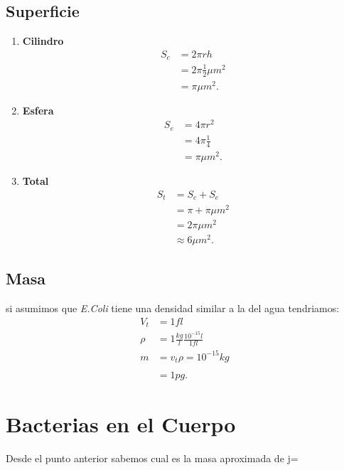 \documentclass{report}
\begin{document}
\subsection{Superficie}

\begin{enumerate}
  \item \textbf{Cilindro}
    \begin{align*}
      S_{c} &= 2\pi rh \\
      &= 2\pi \frac{1}{2} \mu m^2 \\
      &= \pi \mu m^2
    .\end{align*}
  \item \textbf{Esfera}
    \begin{align*}
      S_{e} &=  4 \pi r^2\\
      &= 4 \pi \frac{1}{4} \\
      &= \pi \mu m^2
    .\end{align*}
  \item \textbf{Total}
    \begin{align*}
      S_{t} &= S_{c} + S_{e} \\
      &= \pi + \pi \mu m^2 \\
      &= 2\pi \mu m^2 \\
      &\approx 6 \mu m^2
    .\end{align*}
\end{enumerate}

\subsection{Masa}
si asumimos que \textit{E.Coli} tiene una densidad similar a la del agua tendriamos:
\begin{align*}
  V_{t} &= 1 fl \\
  \rho &= 1 \frac{kg}{l} \frac{10^{-15}l}{1 fl} \\
  m &= v_{t}\rho = 10^{-15}kg \\ \\
  &= 1 pg
.\end{align*}

\section{Bacterias en el Cuerpo}

Desde el punto anterior sabemos cual es la masa aproximada de j=
\end{document}
